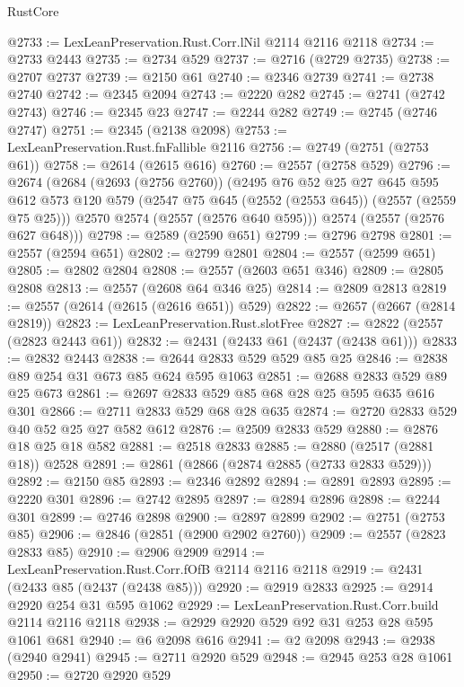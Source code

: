 \begin{lexlean}{RustCore}
\begin{coremodule}
@2733 := LexLeanPreservation.Rust.Corr.lNil @2114 @2116 @2118
@2734 := @2733 @2443
@2735 := @2734 @529
@2737 := @2716 (@2729 @2735)
@2738 := @2707 @2737
@2739 := @2150 @61
@2740 := @2346 @2739
@2741 := @2738 @2740
@2742 := @2345 @2094
@2743 := @2220 @282
@2745 := @2741 (@2742 @2743)
@2746 := @2345 @23
@2747 := @2244 @282
@2749 := @2745 (@2746 @2747)
@2751 := @2345 (@2138 @2098)
@2753 := LexLeanPreservation.Rust.fnFallible @2116
@2756 := @2749 (@2751 (@2753 @61))
@2758 := @2614 (@2615 @616)
@2760 := @2557 (@2758 @529)
@2796 := @2674
    (@2684
      (@2693 (@2756 @2760))
      (@2495
        @76
        @52
        @25
        @27
        @645
        @595
        @612
        @573
        @120
        @579
        (@2547 @75 @645 (@2552 (@2553 @645)) (@2557 (@2559 @75 @25)))
        @2570
        @2574
        (@2557 (@2576 @640 @595)))
      @2574
      (@2557 (@2576 @627 @648)))
@2798 := @2589 (@2590 @651)
@2799 := @2796 @2798
@2801 := @2557 (@2594 @651)
@2802 := @2799 @2801
@2804 := @2557 (@2599 @651)
@2805 := @2802 @2804
@2808 := @2557 (@2603 @651 @346)
@2809 := @2805 @2808
@2813 := @2557 (@2608 @64 @346 @25)
@2814 := @2809 @2813
@2819 := @2557 (@2614 (@2615 (@2616 @651)) @529)
@2822 := @2657 (@2667 (@2814 @2819))
@2823 := LexLeanPreservation.Rust.slotFree
@2827 := @2822 (@2557 (@2823 @2443 @61))
@2832 := @2431 (@2433 @61 (@2437 (@2438 @61)))
@2833 := @2832 @2443
@2838 := @2644 @2833 @529 @529 @85 @25
@2846 := @2838 @89 @254 @31 @673 @85 @624 @595 @1063
@2851 := @2688 @2833 @529 @89 @25 @673
@2861 := @2697 @2833 @529 @85 @68 @28 @25 @595 @635 @616 @301
@2866 := @2711 @2833 @529 @68 @28 @635
@2874 := @2720 @2833 @529 @40 @52 @25 @27 @582 @612
@2876 := @2509 @2833 @529
@2880 := @2876 @18 @25 @18 @582
@2881 := @2518 @2833
@2885 := @2880 (@2517 (@2881 @18)) @2528
@2891 := @2861 (@2866 (@2874 @2885 (@2733 @2833 @529)))
@2892 := @2150 @85
@2893 := @2346 @2892
@2894 := @2891 @2893
@2895 := @2220 @301
@2896 := @2742 @2895
@2897 := @2894 @2896
@2898 := @2244 @301
@2899 := @2746 @2898
@2900 := @2897 @2899
@2902 := @2751 (@2753 @85)
@2906 := @2846 (@2851 (@2900 @2902 @2760))
@2909 := @2557 (@2823 @2833 @85)
@2910 := @2906 @2909
@2914 := LexLeanPreservation.Rust.Corr.fOfB @2114 @2116 @2118
@2919 := @2431 (@2433 @85 (@2437 (@2438 @85)))
@2920 := @2919 @2833
@2925 := @2914 @2920 @254 @31 @595 @1062
@2929 := LexLeanPreservation.Rust.Corr.build @2114 @2116 @2118
@2938 := @2929 @2920 @529 @92 @31 @253 @28 @595 @1061 @681
@2940 := @6 @2098 @616
@2941 := @2 @2098
@2943 := @2938 (@2940 @2941)
@2945 := @2711 @2920 @529
@2948 := @2945 @253 @28 @1061
@2950 := @2720 @2920 @529

\end{coremodule}
\end{lexlean}
